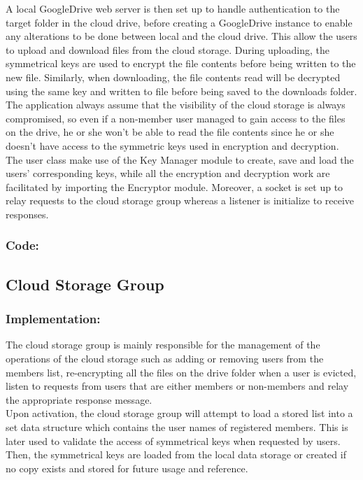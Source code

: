 \documentclass[12pt]{article}
\begin{document}
A local GoogleDrive web server is then set up to handle authentication to the target folder in the cloud drive, before creating a GoogleDrive instance to enable any alterations to be done between local and the cloud drive. This allow the users to upload and download files from the cloud storage. During uploading, the symmetrical keys are used to encrypt the file contents before being written to the new file. Similarly, when downloading, the file contents read will be decrypted using the same key and written to file before being saved to the downloads folder. The application always assume that the visibility of the cloud storage is always compromised, so even if a non-member user managed to gain access to the files on the drive, he or she won't be able to read the file contents since he or she doesn't have access to the symmetric keys used in encryption and decryption. \\

The user class make use of the Key Manager module to create, save and load the users' corresponding keys, while all the encryption and decryption work are facilitated by importing the Encryptor module. Moreover, a socket is set up to relay requests to the cloud storage group whereas a listener is initialize to receive responses. 
\newpage
\subsubsection*{Code:}

\newpage
\subsection*{Cloud Storage Group}
\subsubsection*{Implementation:}
The cloud storage group is mainly responsible for the management of the operations of the cloud storage such as adding or removing users from the members list, re-encrypting all the files on the drive folder when a user is evicted, listen to requests from users that are either members or non-members and relay the appropriate response message. \\

Upon activation, the cloud storage group will attempt to load a stored list into a set data structure which contains the user names of registered members. This is later used to validate the access of symmetrical keys when requested by users. Then, the symmetrical keys are loaded from the local data storage or created if no copy exists and stored for future usage and reference. \\ 
\end{document}
